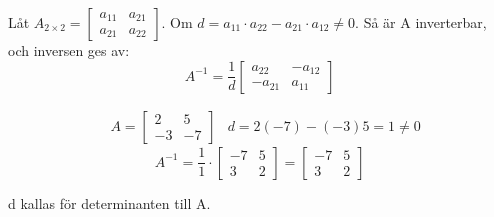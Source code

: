 \begin{sats}
    Låt $A_{2\times 2} = \begin{bmatrix} a_{11}&a_{21}\\a_{21}&a_{22} \end{bmatrix}$. Om $d = a_{11} \cdot a_{22} - a_{21} \cdot a_{12} \neq 0$. Så är A inverterbar, och inversen ges av:
    \[
         A^{-1} = \frac{1}{d}\begin{bmatrix} a_{22}&-a_{12}\\-a_{21}&a_{11} \end{bmatrix}
     \] 
\end{sats}
\begin{Ex}
    \begin{align*}
    &A = \begin{bmatrix} 2&5\\-3&-7 \end{bmatrix} &d = 2(-7) - (-3)5 = 1 \neq 0
    \end{align*}
    \[
        A^{-1} = \frac{1}{1} \cdot \begin{bmatrix} -7&5\\3&2 \end{bmatrix} = \begin{bmatrix} -7&5\\3&2 \end{bmatrix}
    \]
    
\end{Ex}
d kallas för determinanten till A.
